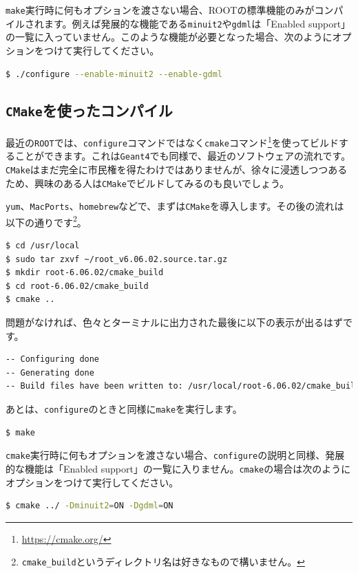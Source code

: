 \texttt{make}実行時に何もオプションを渡さない場合、ROOTの標準機能のみがコンパイルされます。例えば発展的な機能である\texttt{minuit2}や\texttt{gdml}は「Enabled support」の一覧に入っていません。このような機能が必要となった場合、次のようにオプションをつけて実行してください。
\begin{lstlisting}[language=bash]
$ ./configure --enable-minuit2 --enable-gdml
\end{lstlisting}

\subsection{\texttt{CMake}を使ったコンパイル}
\label{subsec_compile_cmake}
最近の\texttt{ROOT}では、\texttt{configure}コマンドではなく\texttt{cmake}コマンド\footnote{\url{https://cmake.org/}}を使ってビルドすることができます。これは\texttt{Geant4}でも同様で、最近のソフトウェアの流れです。\texttt{CMake}はまだ完全に市民権を得たわけではありませんが、徐々に浸透しつつあるため、興味のある人は\texttt{CMake}でビルドしてみるのも良いでしょう。

\texttt{yum}、\texttt{MacPorts}、\texttt{homebrew}などで、まずは\texttt{CMake}を導入します。その後の流れは以下の通りです\footnote{\texttt{cmake\_build}というディレクトリ名は好きなもので構いません。}。

\begin{lstlisting}[language=bash]
$ cd /usr/local
$ sudo tar zxvf ~/root_v6.06.02.source.tar.gz
$ mkdir root-6.06.02/cmake_build
$ cd root-6.06.02/cmake_build
$ cmake ..
\end{lstlisting}

問題がなければ、色々とターミナルに出力された最後に以下の表示が出るはずです。
\begin{lstlisting}[language=bash]
-- Configuring done
-- Generating done
-- Build files have been written to: /usr/local/root-6.06.02/cmake_build
\end{lstlisting}

あとは、\texttt{configure}のときと同様に\texttt{make}を実行します。
\begin{lstlisting}[language=bash]
$ make
\end{lstlisting}

\texttt{cmake}実行時に何もオプションを渡さない場合、\texttt{configure}の説明と同様、発展的な機能は「Enabled support」の一覧に入りません。\texttt{cmake}の場合は次のようにオプションをつけて実行してください。
\begin{lstlisting}[language=bash]
$ cmake ../ -Dminuit2=ON -Dgdml=ON
\end{lstlisting}

